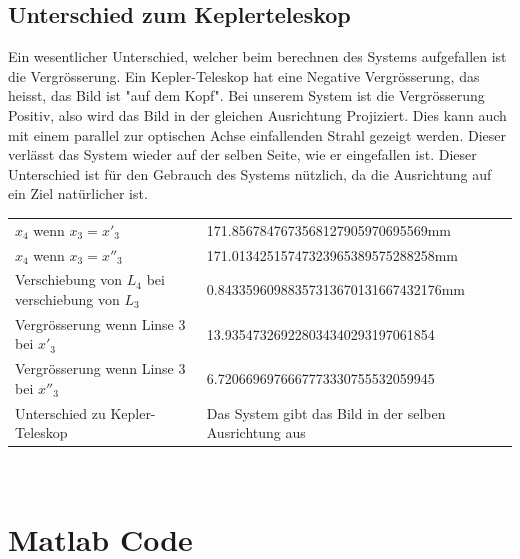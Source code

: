 \documentclass[11pt,twoside,a4paper]{article}
\begin{document}
	\subsection{Unterschied zum Keplerteleskop}
	Ein wesentlicher Unterschied, welcher beim berechnen des Systems aufgefallen ist die Vergrösserung. Ein Kepler-Teleskop hat eine Negative Vergrösserung, das heisst, das Bild ist "auf dem Kopf". Bei unserem System ist die Vergrösserung Positiv, also wird das Bild in der gleichen Ausrichtung Projiziert. Dies kann auch mit einem parallel zur optischen Achse einfallenden Strahl gezeigt werden. Dieser verlässt das System wieder auf der selben Seite, wie er eingefallen ist. Dieser Unterschied ist für den Gebrauch des Systems nützlich, da die Ausrichtung auf ein Ziel natürlicher ist.
	\begin{table}
		\centering
		\begin{tabular}{ll}
			\(x_{4}\) wenn \(x_{3} = x'_{3}\) & 171.8567847673568127905970695569mm \\
			\(x_{4}\) wenn \(x_{3} = x''_{3}\) & 171.01342515747323965389575288258mm \\
			Verschiebung von \(L_{4}\) bei verschiebung von \(L_{3}\) & 0.84335960988357313670131667432176mm\\
			Vergrösserung wenn Linse 3 bei \(x'_{3}\) & 13.935473269228034340293197061854 \\
			Vergrösserung wenn Linse 3 bei \(x''_{3}\) & 6.7206696976667773330755532059945 \\
			Unterschied zu Kepler-Teleskop & Das System gibt das Bild in der selben Ausrichtung aus \\
		\end{tabular}
	\end{table} \\



\section*{Matlab Code}


\end{document}
